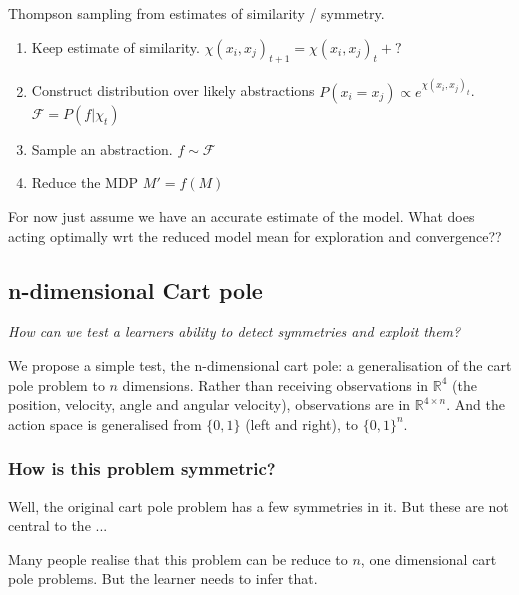 Thompson sampling from estimates of similarity / symmetry.
\begin{enumerate}
	\tightlist
	\item Keep estimate of similarity. $\chi(x_i, x_j)_{t+1} = \chi(x_i, x_j)_t + ?$
	\item Construct distribution over likely abstractions $P(x_i = x_j) \propto e^{\chi(x_i, x_j)_t}$. $\mathcal F = P(f|\chi_t)$
	\item Sample an abstraction. $f\sim \mathcal F$
	\item Reduce the MDP $M' = f(M)$
\end{enumerate}


For now just assume we have an accurate estimate of the model.
What does acting optimally wrt the reduced model mean for exploration and convergence??



\subsection{n-dimensional Cart pole}

\begin{displayquote}
  \textit{How can we test a learners ability to detect symmetries and exploit them?}
\end{displayquote}

We propose a simple test, the n-dimensional cart pole: a generalisation of the
cart pole problem to $n$ dimensions. Rather than receiving observations in
$\mathbb{R}^4$ (the position, velocity, angle and angular velocity), observations are
in $\mathbb{R}^{4\times n}$. And the action space is generalised from $\{0,1\}$ (left and right),
to $\{0,1\}^{n}$.

\cite{Brockman2016,baselines}



\subsubsection{How is this problem symmetric?}

Well, the original cart pole problem has a few symmetries in it. But these are
not central to the ...

Many people realise that this problem can be reduce to $n$, one dimensional cart pole problems.
But the learner needs to infer that.

